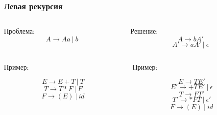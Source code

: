 \documentclass[xetex,mathserif,serif]{beamer}
\begin{document}
	\begin{frame}
		\frametitle{Левая рекурсия}
		\begin{columns}[t]
			\begin{column}{0.5\textwidth}
				Проблема:
				$$A \rightarrow Aa\ |\ b$$
			\end{column}
			\begin{column}{0.5\textwidth}
				Решение: 
				$$A \rightarrow bA'$$
				$$A' \rightarrow aA'\ |\ \epsilon$$
			\end{column}
		\end{columns}
		\begin{columns}[t]
			\begin{column}{0.5\textwidth}
				Пример:
				
				$$E \rightarrow E + T\ |\ T$$
				$$T \rightarrow T * F\ |\ F$$
				$$F \rightarrow (E)\ |\ id$$
			\end{column}
			\begin{column}{0.5\textwidth}
				Пример:

				$$E \rightarrow TE'$$
				$$E' \rightarrow +TE'\ |\ \epsilon$$
				$$T \rightarrow FT'$$
				$$T' \rightarrow *FT\ |\ \epsilon'$$
				$$F \rightarrow (E)\ |\ id$$
			\end{column}
		\end{columns}
	\end{frame}
\end{document}
